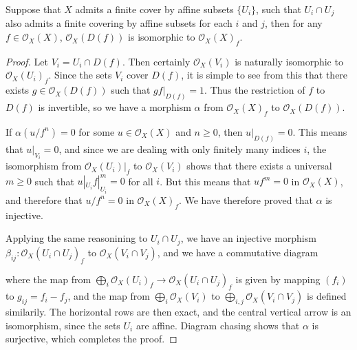 \begin{theorem} \label{distinguishedneighborhoodslocalizationtheorem}
    Suppose that $X$ admits a finite cover by affine subsets $\{ U_i \}$, such that $U_i \cap U_j$ also admits a finite covering by affine subsets for each $i$ and $j$, then for any $f \in \mathcal{O}_X(X)$, $\mathcal{O}_X(D(f))$ is isomorphic to $\mathcal{O}_X(X)_f$.
\end{theorem}
\begin{proof}
    Let $V_i = U_i \cap D(f)$. Then certainly $\mathcal{O}_X(V_i)$ is naturally isomorphic to $\mathcal{O}_X(U_i)_f$. Since the sets $V_i$ cover $D(f)$, it is simple to see from this that there exists $g \in \mathcal{O}_X(D(f))$ such that $gf|_{D(f)} = 1$. Thus the restriction of $f$ to $D(f)$ is invertible, so we have a morphism $\alpha$ from $\mathcal{O}_X(X)_f$ to $\mathcal{O}_X(D(f))$.

    If $\alpha(u/f^n) = 0$ for some $u \in \mathcal{O}_X(X)$ and $n \geq 0$, then $u|_{D(f)} = 0$. This means that $u|_{V_i} = 0$, and since we are dealing with only finitely many indices $i$, the isomorphism from $\mathcal{O}_X(U_i)|_f$ to $\mathcal{O}_X(V_i)$ shows that there exists a universal $m \geq 0$ such that $u|_{U_i} f|_{U_i}^m = 0$ for all $i$. But this means that $uf^m = 0$ in $\mathcal{O}_X(X)$, and therefore that $u/f^n = 0$ in $\mathcal{O}_X(X)_f$. We have therefore proved that $\alpha$ is injective.

    Applying the same reasonining to $U_i \cap U_j$, we have an injective morphism $\beta_{ij}: \mathcal{O}_X(U_i \cap U_j)_f$ to $\mathcal{O}_X(V_i \cap V_j)$, and we have a commutative diagram
    \begin{center}
    \end{center}
    where the map from $\bigoplus_i \mathcal{O}_X(U_i)_f \to \mathcal{O}_X(U_i \cap U_j)_f$ is given by mapping $(f_i)$ to $g_{ij} = f_i - f_j$, and the map from $\bigoplus_i \mathcal{O}_X(V_i)$ to $\bigoplus_{i,j} \mathcal{O}_X(V_i \cap V_j)$ is defined similarily. The horizontal rows are then exact, and the central vertical arrow is an isomorphism, since the sets $U_i$ are affine. Diagram chasing shows that $\alpha$ is surjective, which completes the proof.
\end{proof}

